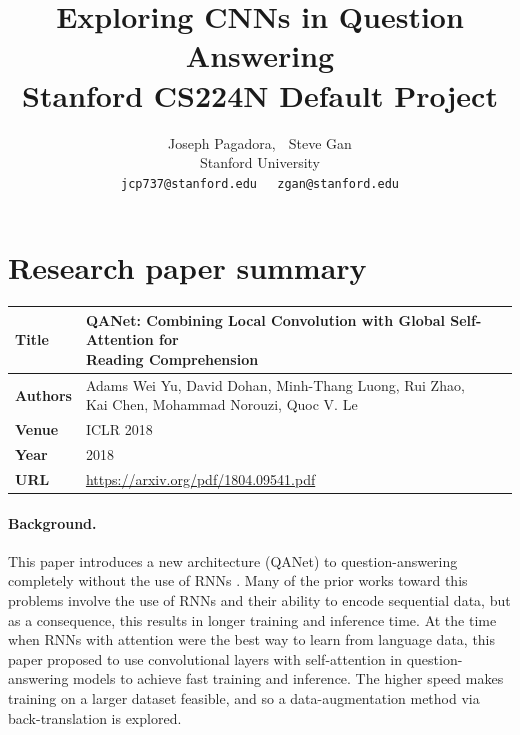 \documentclass{article}
\title{
  Exploring CNNs in Question Answering \\
  \vspace{1em}
  \small{\normalfont Stanford CS224N Default Project}  %
}
\author{
  Joseph Pagadora, $\;$ Steve Gan \\
  Stanford University \\
  \texttt{jcp737@stanford.edu}$\;\;\;\;$
  \texttt{zgan@stanford.edu} \\
}
\begin{document}
\maketitle


\section{Research paper summary}

\begin{table}[h]
    \centering
    \begin{tabular}{ll}
        \toprule
        \textbf{Title} & \makecell{QANet: Combining Local Convolution with Global Self-Attention for \\ Reading Comprehension} \\
        \midrule
        \textbf{Authors} & \makecell{Adams Wei Yu, David Dohan, Minh-Thang Luong, Rui Zhao, \\ Kai Chen, Mohammad Norouzi, Quoc V. Le} \\
        \textbf{Venue} & ICLR 2018 \\
        \textbf{Year}  & 2018 \\
        \textbf{URL}   & \url{https://arxiv.org/pdf/1804.09541.pdf} \\
        \bottomrule
    \end{tabular}
    \vspace{1em}
\end{table}

\paragraph{Background.}
This paper introduces a new architecture (QANet) to question-answering completely without the use of RNNs \cite{YU}. Many of the prior works toward this problems involve the use of RNNs and their ability to encode sequential data, but as a consequence, this results in longer training and inference time. At the time when RNNs with attention were the best way to learn from language data, this paper proposed to use convolutional layers with self-attention in question-answering models to achieve fast training and inference. The higher speed makes training on a larger dataset feasible, and so a data-augmentation method via back-translation is explored.
\end{document}
